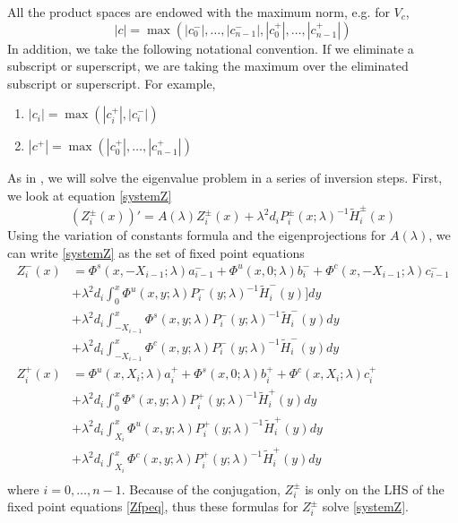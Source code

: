 \documentclass[thesis.tex]{subfiles}
\begin{document}
All the product spaces are endowed with the maximum norm, e.g. for $V_c$, 
\[
|c| = \max(|c_0^-|, \dots, |c_{n-1}^-|, |c_0^+|, \dots, |c_{n-1}^+|)
\]
In addition, we take the following notational convention. If we eliminate a subscript or superscript, we are taking the maximum over the eliminated subscript or superscript. For example,
\begin{enumerate}
	\item $|c_i| = \max(|c_i^+|, |c_i^-|)$ 
	\item $|c^+| = \max(|c_0^+|, \dots, |c_{n-1}^+|)$
\end{enumerate}

As in \cite{Sandstede1998}, we will solve the eigenvalue problem in a series of inversion steps. First, we look at equation \eqref{systemZ}
\[
(Z_i^\pm(x))' = A(\lambda) Z_i^\pm(x) + \lambda^2 d_i P_i^\pm(x; \lambda)^{-1} \tilde{H}_i^\pm(x) 
\]
Using the variation of constants formula and the eigenprojections for $A(\lambda)$, we can write \eqref{systemZ} as the set of fixed point equations
\begin{equation}\label{Zfpeq}
\begin{aligned}
Z_i^-(x) &= \Phi^s(x, -X_{i-1}; \lambda) a_{i-1}^- + \Phi^u(x, 0; \lambda) b_i^- + \Phi^c(x, -X_{i-1}; \lambda) c_{i-1}^- \\
&+ \lambda^2 d_i \int_0^x \Phi^u(x, y; \lambda) P_i^-(y; \lambda)^{-1} \tilde{H}_i^-(y)] dy \\
&+ \lambda^2 d_i \int_{-X_{i-1}}^x \Phi^s(x, y; \lambda) P_i^-(y; \lambda)^{-1} \tilde{H}_i^-(y) dy \\
&+ \lambda^2 d_i \int_{-X_{i-1}}^x \Phi^c(x, y; \lambda) P_i^-(y; \lambda)^{-1} \tilde{H}_i^-(y) dy  \\ 
Z_i^+(x) &= \Phi^u(x, X_i; \lambda) a_i^+ + \Phi^s(x, 0; \lambda) b_i^+ + \Phi^c(x, X_i; \lambda) c_i^+ \\
&+ \lambda^2 d_i \int_0^x \Phi^s(x, y; \lambda) P_i^+(y; \lambda)^{-1} \tilde{H}_i^+(y) dy \\
&+ \lambda^2 d_i \int_{X_i}^x \Phi^u(x, y; \lambda) P_i^+(y; \lambda)^{-1} \tilde{H}_i^+(y) dy \\
&+ \lambda^2 d_i \int_{X_i}^x \Phi^c(x, y; \lambda) P_i^+(y; \lambda)^{-1} \tilde{H}_i^+(y) dy \\
\end{aligned}
\end{equation}
where $i = 0, \dots, n-1$. Because of the conjugation, $Z_i^\pm$ is only on the LHS of the fixed point equations \eqref{Zfpeq}, thus these formulas for $Z_i^\pm$ solve \eqref{systemZ}.
\end{document}
